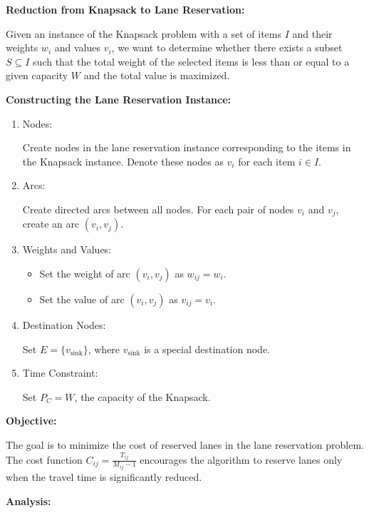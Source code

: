 \documentclass{article}
\begin{document}
\textbf{Reduction from Knapsack to Lane Reservation:}

Given an instance of the Knapsack problem with a set of items \(I\) and their weights \(w_i\) and values \(v_i\), we want to determine whether there exists a subset \(S \subseteq I\) such that the total weight of the selected items is less than or equal to a given capacity \(W\) and the total value is maximized.

\textbf{Constructing the Lane Reservation Instance:}

\begin{enumerate}
  \item Nodes:

  Create nodes in the lane reservation instance corresponding to the items in the Knapsack instance. Denote these nodes as \(v_i\) for each item \(i \in I\).

  \item Arcs:

  Create directed arcs between all nodes. For each pair of nodes \(v_i\) and \(v_j\), create an arc \((v_i, v_j)\).

  \item Weights and Values:
  \begin{itemize}
    \item Set the weight of arc \((v_i, v_j)\) as \(w_{ij} = w_i\).
    \item Set the value of arc \((v_i, v_j)\) as \(v_{ij} = v_i\).
  \end{itemize}

  \item Destination Nodes:

  Set \(E = \{v_{\text{sink}}\}\), where \(v_{\text{sink}}\) is a special destination node.

  \item Time Constraint:

  Set \(P_C = W\), the capacity of the Knapsack.
\end{enumerate}

\textbf{Objective:}

The goal is to minimize the cost of reserved lanes in the lane reservation problem. The cost function \(C_{ij} = \frac{T_{ij}}{M_{ij}-1}\) encourages the algorithm to reserve lanes only when the travel time is significantly reduced.

\textbf{Analysis:}
\end{document}
